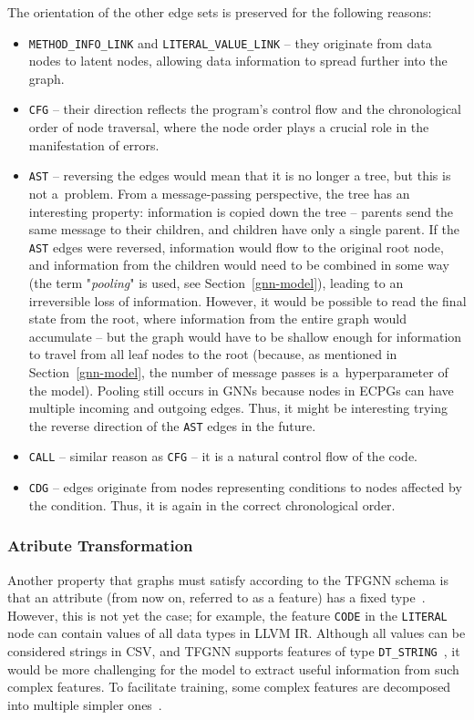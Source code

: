 The orientation of the other edge sets is preserved for the following reasons:
\begin{itemize}
    \item \texttt{METHOD\_INFO\_LINK} and \texttt{LITERAL\_VALUE\_LINK} -- they originate from data nodes to latent nodes, allowing data information to spread further into the graph.
    \item \texttt{CFG} -- their direction reflects the program's control flow and the chronological order of node traversal, where the node order plays a crucial role in the manifestation of errors.
    \item \texttt{AST} -- reversing the edges would mean that it is no longer a tree, but this is not a~problem. From a message-passing perspective, the tree has an interesting property: information is copied down the tree -- parents send the same message to their children, and children have only a single parent. If the \texttt{AST} edges were reversed, information would flow to the original root node, and information from the children would need to be combined in some way (the term "\textit{pooling}" is used, see Section~\ref{gnn-model}), leading to an irreversible loss of information. However, it would be possible to read the final state from the root, where information from the entire graph would accumulate -- but the graph would have to be shallow enough for information to travel from all leaf nodes to the root (because, as mentioned in Section~\ref{gnn-model}, the number of message passes is a~hyperparameter of the model). Pooling still occurs in GNNs because nodes in ECPGs can have multiple incoming and outgoing edges. Thus, it might be interesting trying the reverse direction of the \texttt{AST} edges in the future.
    \item \texttt{CALL} -- similar reason as \texttt{CFG} -- it is a natural control flow of the code.
    \item \texttt{CDG} -- edges originate from nodes representing conditions to nodes affected by the condition. Thus, it is again in the correct chronological order.
\end{itemize}


\subsubsection{Atribute Transformation}
Another property that graphs must satisfy according to the TFGNN schema is that an attribute (from now on, referred to as a feature) has a fixed type~\cite{tfgnn-schema}. However, this is not yet the case; for example, the feature \texttt{CODE} in the \texttt{LITERAL} node can contain values of all data types in LLVM IR. Although all values can be considered strings in CSV, and TFGNN supports features of type \texttt{DT\_STRING}~\cite{tfgnn-schema}, it would be more challenging for the model to extract useful information from such complex features. To facilitate training, some complex features are decomposed into multiple simpler ones~\cite{feature-splitting}.

